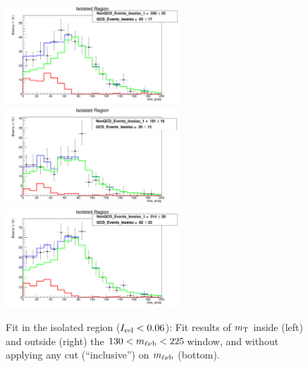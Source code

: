 \begin{figure}[h!]
\begin{center}
\includegraphics[width=6.5cm]{figures/2J1T/MTW_fit_2j1t_lessiso_SR.png}
\includegraphics[width=6.5cm]{figures/2J1T/MTW_fit_2j1t_lessiso_SB.png}\hfill
\includegraphics[width=6.5cm]{figures/2J1T/MTW_fit_2j1t_lessiso_inclusive_mTop_range.png}
\caption{\label{fig:qcdFit2J1TmtWLessIso} Fit in the isolated region ($I_{\mathrm{rel}} < 0.06$): Fit results of $m_{\mathrm{\rm T}}$ inside (left) and outside (right) the $130<m_{\ell\nu \mathrm{b}}<225\,$\GeV window, and without applying any cut (``inclusive'') on $m_{\ell\nu \mathrm{b}}$ (bottom).  }
\end{center}
\end{figure}

